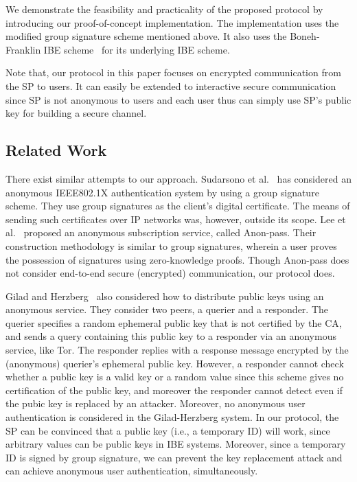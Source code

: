\documentclass[preprint]{sig-alternate}
\begin{document}
We demonstrate the feasibility and practicality of the proposed protocol by introducing our proof-of-concept implementation.
The implementation uses the modified group signature scheme mentioned above.
It also uses the Boneh-Franklin IBE scheme~\cite{[BonehF03]} for its underlying IBE scheme. 

Note that, our protocol in this paper focuses on encrypted communication from the SP to users. 
It can easily be extended to interactive secure communication since SP is not anonymous to users and each user thus can simply use SP's public key for building a secure channel.

\subsection{Related Work}

There exist similar attempts to our approach.
Sudarsono et al.~\cite{[SudarsonoNNF10]} has considered an anonymous IEEE802.1X authentication system by using a group signature scheme.
They use group signatures as the client's digital certificate.
The means of sending such certificates over IP networks was, however, outside its scope. 
Lee et al.~\cite{anon-pass13} proposed an anonymous subscription service, called Anon-pass.
Their construction methodology is similar to group signatures, wherein a user proves the possession of signatures using zero-knowledge proofs.
Though Anon-pass does not consider end-to-end secure (encrypted) communication, our protocol does. 

Gilad and Herzberg~\cite{[GiladH13]} also considered how to distribute public keys using an anonymous service.
They consider two peers, a querier and a responder.
The querier specifies a random ephemeral public key that is not certified by the CA, 
and sends a query containing this public key to a responder via an anonymous service, like Tor. 
The responder replies with a response message encrypted by the (anonymous) querier's ephemeral public key.
However, a responder cannot check whether a public key is a valid key or a random value since this scheme gives no certification of the public key, and moreover the responder cannot detect even if the pubic key is replaced by an attacker. 
Moreover, no anonymous user authentication is considered in the Gilad-Herzberg system. 
In our protocol, the SP can be convinced that a public key (i.e., a temporary ID) will work, since arbitrary values can be public keys in IBE systems. 
Moreover, since a temporary ID is signed by group signature, 
we can prevent the key replacement attack and can achieve anonymous user authentication, simultaneously. 
\end{document}
